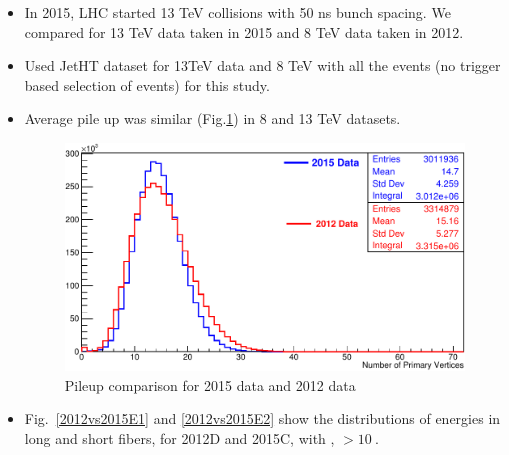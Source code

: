 \begin{itemize}
\item In 2015, LHC started 13 TeV collisions with 50 ns bunch spacing. We compared \ratiosl for 13 TeV data taken in 2015 and 8 TeV data taken in 2012.
\item Used JetHT dataset for 13TeV data and 8 TeV with all the events (no trigger based selection of events) for this study.
\item Average pile up was similar (Fig.\ref{fig:nVertices}) in 8 and 13 TeV datasets.

\begin{figure}[h!]
\centering
\includegraphics[width=0.7\linewidth]{../Figures/Chap2/ImageFiles_HF/2012vs2015/nVertices.pdf}
\caption{Pileup comparison for 2015 data and 2012 data}
\label{fig:nVertices}
\end{figure}

\item Fig.~\ref{2012vs2015E1} and \ref{2012vs2015E2} show the distributions of energies in long and short fibers, for 2012D and 2015C, with \elong, \eshort $>10~$\gev.


\end{itemize}
